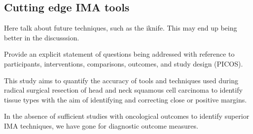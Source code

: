 \subsection{Cutting edge IMA tools}

Here talk about future techniques, such as the iknife. 
This may end up being better in the discusssion.

Provide an explicit statement of questions being addressed with reference to participants, interventions, comparisons, outcomes, and study design (PICOS). 

This study aims to quantify the accuracy of tools and techniques used during radical surgical resection of head and neck squamous cell carcinoma to identify tissue types with the aim of identifying and correcting close or positive margins.


In the absence of sufficient studies with oncological outcomes to identify superior IMA techniques, we have gone for diagnostic outcome measures.
